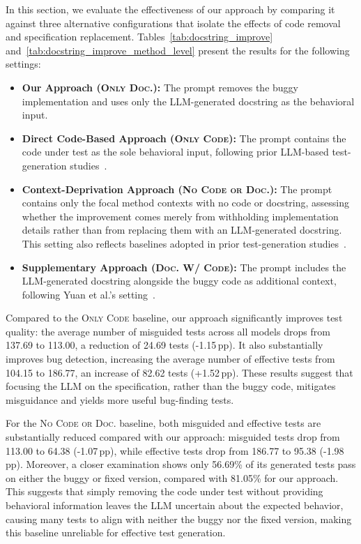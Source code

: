 \documentclass[acmsmall]{acmart}
\begin{document}
In this section, we evaluate the effectiveness of our approach by comparing it against three alternative configurations that isolate the effects of code removal and specification replacement. Tables~\ref{tab:docstring_improve} and~\ref{tab:docstring_improve_method_level} present the results for the following settings:
\begin{itemize}[leftmargin=10pt]
    \item \textbf{Our Approach (\textsc{Only Doc.}):} The prompt removes the buggy implementation and uses only the LLM-generated docstring as the behavioral input.
    \item \textbf{Direct Code-Based Approach (\textsc{Only Code}):} The prompt contains the code under test as the sole behavioral input, following prior LLM-based test-generation studies~\cite{EmpEvalforLLMUTAutoGenTSE, EvalImprChatgptUTGenFSE2024, CODAMOSAICSE2023}.
    \item \textbf{Context-Deprivation Approach (\textsc{No Code or Doc.}):} The prompt contains only the focal method contexts with no code or docstring, assessing whether the improvement comes merely from withholding implementation details rather than from replacing them with an LLM-generated docstring. This setting also reflects baselines adopted in prior test-generation studies~\cite{Doc2OracLL, TOGA, TOGLL}.
    \item \textbf{Supplementary Approach (\textsc{Doc. W/ Code}):} The prompt includes the LLM-generated docstring alongside the buggy code as additional context, following Yuan et al.'s setting~\cite{EvalImprChatgptUTGenFSE2024}.
\end{itemize}

Compared to the \textsc{Only Code} baseline, our approach significantly improves test quality: the average number of misguided tests across all models drops from 137.69 to 113.00, a reduction of 24.69 tests (-1.15\,pp). It also substantially improves bug detection, increasing the average number of effective tests from 104.15 to 186.77, an increase of 82.62 tests (+1.52\,pp). These results suggest that focusing the LLM on the specification, rather than the buggy code, mitigates misguidance and yields more useful bug-finding tests.

For the \textsc{No Code or Doc.} baseline, both misguided and effective tests are substantially reduced compared with our approach: misguided tests drop from 113.00 to 64.38 (-1.07\,pp), while effective tests drop from 186.77 to 95.38 (-1.98\,pp). Moreover, a closer examination shows only 56.69\% of its generated tests pass on either the buggy or fixed version, compared with 81.05\% for our approach. This suggests that simply removing the code under test without providing behavioral information leaves the LLM uncertain about the expected behavior, causing many tests to align with neither the buggy nor the fixed version, making this baseline unreliable for effective test generation.
\end{document}
